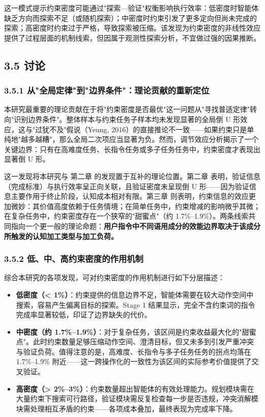 \documentclass[12pt,a4paper,openany,oneside]{ctexrep}
\begin{document}
这一模式提示约束密度可能通过"探索—验证"权衡影响执行效率：低密度时智能体缺乏方向而探索不足（或随机探索）；中密度时约束引发了更多定向但尚未完成的探索；高密度时约束过于严格，导致探索被压缩。该发现为约束密度的非线性效应提供了过程层面的机制线索，但因属于观测性探索分析，不宜做过强的因果推断。

\subsection{3.5 讨论}


\subsubsection{3.5.1 从"全局定律"到"边界条件"：理论贡献的重新定位}


本研究最重要的理论贡献在于将"约束密度是否最优"这一问题从"寻找普适定律"转向"识别边界条件"。整体样本与约束任务子样本均未发现显著的全局倒 U 形效应，这与"过犹不及"假说（Yeung, 2016）的直接推论不一致——如果约束只是单纯地"越多越糟"，那么全局二次项应当显著为负。然而，调节效应分析揭示了一个关键边界：只有在高难度任务、长指令任务或多子任务任务中，约束密度才表现出显著倒 U 形。

这一发现将本研究与 第二章 的发现置于互补的理论位置。第二章 表明，验证信息（完成标准）与执行效率呈正向关联，且验证密度未呈现倒 U 形——因为验证信息主要作用于终止阶段，认知成本相对有限。第三章 则表明，约束信息的效应更加微妙：其价值高度依赖于任务情境；在简单任务中，约束增减的影响微乎其微；在复杂任务中，约束密度存在一个狭窄的"甜蜜点"（约 1.7\%–1.9\%）。两条线索共同指向一个更一般的理论命题：\textbf{用户指令中不同语用成分的效能边界取决于该成分所触发的认知加工类型与加工负荷。}

\subsubsection{3.5.2 低、中、高约束密度的作用机制}


综合本研究的各项发现，可对约束密度的作用机制进行如下分层描述：

\begin{itemize}
\item \textbf{低密度（< 1\%）}：约束提供的信息边界不足，智能体需要在较大动作空间中搜索，容易产生偏离目标的探索。Stage 1 结果显示，完全不含约束词的指令完成率显著较低，印证了边界缺失的代价。
\item \textbf{中密度（约 1.7\%–1.9\%）}：对于复杂任务，该区间是约束收益最大化的"甜蜜点"。此时约束数量足够压缩动作空间、澄清目标，但又未多到引发严重冲突与验证负荷。值得注意的是，高难度、长指令与多子任务任务的拐点均落在 1.7\%–1.9\% 附近——这一跨操作化的一致性为该区间的实际参考价值提供了交叉验证。
\item \textbf{高密度（> 2\%–3\%）}：约束数量超出智能体的有效处理能力。规划模块需在大量约束下搜索可行路径，验证模块需反复检查每一步是否违规，冲突消解模块需处理相互矛盾的约束——各项成本叠加，最终表现为完成率下降。
\end{itemize}
\end{document}
